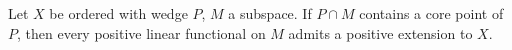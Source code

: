 Let $X$ be ordered with wedge $P$, $M$ a subspace. If $P\cap M$ contains a core point of $P$, then every positive linear functional on $M$ admits a positive extension to $X$.
